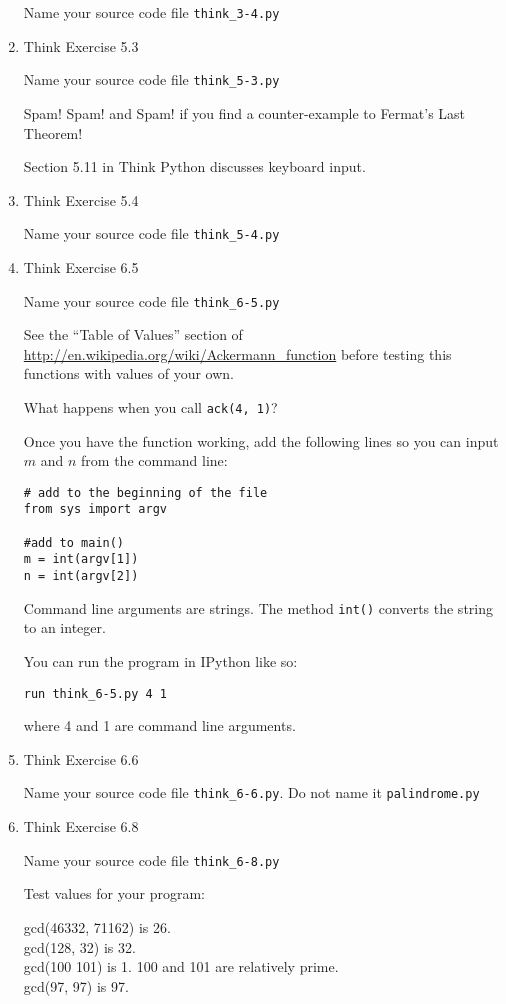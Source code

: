 \documentclass[12pt]{article}
\begin{document}
\begin{enumerate}
Name your source code file \texttt{think\_3-4.py}

\item{Think Exercise 5.3}

Name your source code file \texttt{think\_5-3.py}

Spam! Spam! and Spam! if you find a counter-example to Fermat's Last Theorem! 

Section 5.11 in Think Python discusses keyboard input.

\item{Think Exercise 5.4}

Name your source code file \texttt{think\_5-4.py}

\item{Think Exercise 6.5}

Name your source code file \texttt{think\_6-5.py}

See the ``Table of Values'' section of \url{http://en.wikipedia.org/wiki/Ackermann_function} before testing this functions with values of your own.

What happens when you call \texttt{ack(4, 1)}?

Once you have the function working, add the following lines so you can input $m$ and $n$ from the command line:

\begin{verbatim}
# add to the beginning of the file
from sys import argv

#add to main()
m = int(argv[1])
n = int(argv[2])
\end{verbatim}

Command line arguments are strings. The method \texttt{int()} converts the string to an integer. 

You can run the program in IPython like so:

\texttt{run think\_6-5.py 4 1}

where 4 and 1 are command line arguments. 

\item Think Exercise 6.6

Name your source code file \texttt{think\_6-6.py}. Do not name it \texttt{palindrome.py}


\item Think Exercise 6.8

  Name your source code file \texttt{think\_6-8.py}

  Test values for your program: 
  
  gcd(46332, 71162) is 26.
  \\gcd(128, 32) is 32.
 \\gcd(100 101) is 1. 100 and 101 are relatively prime.
\\gcd(97, 97) is 97.


\end{enumerate}
\end{document}
